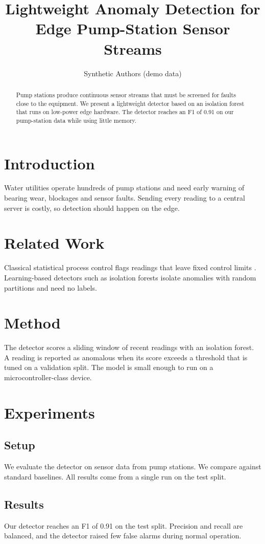 \documentclass{article}
\title{Lightweight Anomaly Detection for Edge Pump-Station Sensor Streams}
\author{Synthetic Authors (demo data)}
\begin{document}
\maketitle

\begin{abstract}
Pump stations produce continuous sensor streams that must be screened for faults close to the equipment. We present a lightweight detector based on an isolation forest that runs on low-power edge hardware. The detector reaches an F1 of 0.91 on our pump-station data while using little memory.
\end{abstract}

\section{Introduction}
Water utilities operate hundreds of pump stations and need early warning of bearing wear, blockages and sensor faults. Sending every reading to a central server is costly, so detection should happen on the edge.

\section{Related Work}
Classical statistical process control flags readings that leave fixed control limits \cite{shewhart}. Learning-based detectors such as isolation forests \cite{liu2008} isolate anomalies with random partitions and need no labels.

\section{Method}
The detector scores a sliding window of recent readings with an isolation forest. A reading is reported as anomalous when its score exceeds a threshold that is tuned on a validation split. The model is small enough to run on a microcontroller-class device.

\section{Experiments}
\subsection{Setup}
We evaluate the detector on sensor data from pump stations. We compare against standard baselines. All results come from a single run on the test split.

\subsection{Results}
Our detector reaches an F1 of 0.91 on the test split. Precision and recall are balanced, and the detector raised few false alarms during normal operation.
\end{document}
